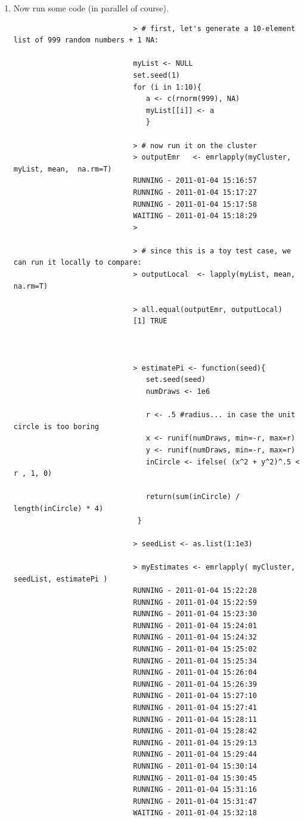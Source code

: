 \documentclass[a4paper, 11pt]{report}
\begin{document}
\begin{enumerate}
\begin{enumerate}
				\item Now run some code (in parallel of course). \\ \footnotesize
					\begin{verbatim}
							> # first, let's generate a 10-element list of 999 random numbers + 1 NA:
							 
							myList <- NULL
							set.seed(1)
							for (i in 1:10){
							   a <- c(rnorm(999), NA)
							   myList[[i]] <- a
							   }
							 
							> # now run it on the cluster
							> outputEmr   <- emrlapply(myCluster, myList, mean,  na.rm=T)
							RUNNING - 2011-01-04 15:16:57
							RUNNING - 2011-01-04 15:17:27
							RUNNING - 2011-01-04 15:17:58
							WAITING - 2011-01-04 15:18:29
							>
							
							> # since this is a toy test case, we can run it locally to compare:
							> outputLocal  <- lapply(myList, mean, na.rm=T)
																					 
							> all.equal(outputEmr, outputLocal)
							[1] TRUE
							
							
							
							> estimatePi <- function(seed){
							   set.seed(seed)
							   numDraws <- 1e6
							 
							   r <- .5 #radius... in case the unit circle is too boring
							   x <- runif(numDraws, min=-r, max=r)
							   y <- runif(numDraws, min=-r, max=r)
							   inCircle <- ifelse( (x^2 + y^2)^.5 < r , 1, 0)
							 
							   return(sum(inCircle) / length(inCircle) * 4)
							 }
							 
							> seedList <- as.list(1:1e3)
							 
							> myEstimates <- emrlapply( myCluster, seedList, estimatePi )
							RUNNING - 2011-01-04 15:22:28
							RUNNING - 2011-01-04 15:22:59
							RUNNING - 2011-01-04 15:23:30
							RUNNING - 2011-01-04 15:24:01
							RUNNING - 2011-01-04 15:24:32
							RUNNING - 2011-01-04 15:25:02
							RUNNING - 2011-01-04 15:25:34
							RUNNING - 2011-01-04 15:26:04
							RUNNING - 2011-01-04 15:26:39
							RUNNING - 2011-01-04 15:27:10
							RUNNING - 2011-01-04 15:27:41
							RUNNING - 2011-01-04 15:28:11
							RUNNING - 2011-01-04 15:28:42
							RUNNING - 2011-01-04 15:29:13
							RUNNING - 2011-01-04 15:29:44
							RUNNING - 2011-01-04 15:30:14
							RUNNING - 2011-01-04 15:30:45
							RUNNING - 2011-01-04 15:31:16
							RUNNING - 2011-01-04 15:31:47
							WAITING - 2011-01-04 15:32:18
							 

\end{verbatim}
\end{enumerate}
\end{enumerate}
\end{document}
